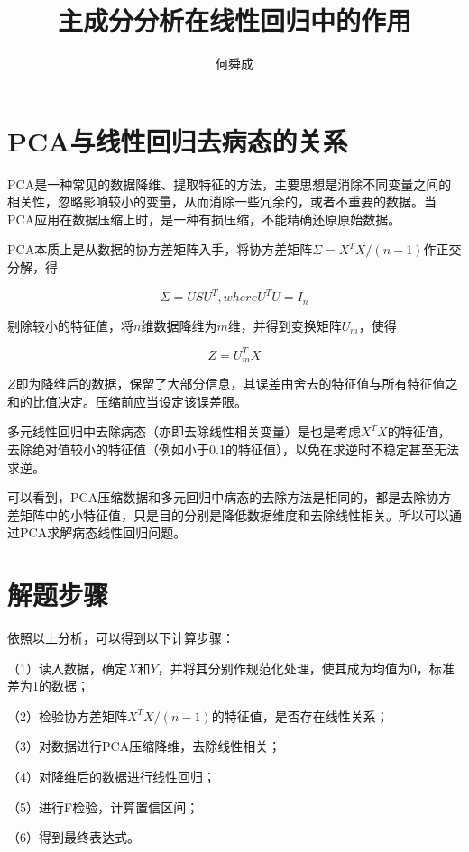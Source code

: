 \documentclass[UTF8]{ctexart}
\author{何舜成}
\title{主成分分析在线性回归中的作用}
\begin{document}
\maketitle
\section{PCA与线性回归去病态的关系}
PCA是一种常见的数据降维、提取特征的方法，主要思想是消除不同变量之间的相关性，忽略影响较小的变量，从而消除一些冗余的，或者不重要的数据。当PCA应用在数据压缩上时，是一种有损压缩，不能精确还原原始数据。\par
PCA本质上是从数据的协方差矩阵入手，将协方差矩阵$\Sigma=X^{T}X/(n-1)$作正交分解，得\par
\begin{equation}
\Sigma=USU^{T}, where  U^{T}U=I_{n}
\end{equation}
\par
剔除较小的特征值，将$n$维数据降维为$m$维，并得到变换矩阵$U_{m}$，使得\par
\begin{equation}
Z=U^{T}_{m}X
\end{equation}
\par
$Z$即为降维后的数据，保留了大部分信息，其误差由舍去的特征值与所有特征值之和的比值决定。压缩前应当设定该误差限。\par
多元线性回归中去除病态（亦即去除线性相关变量）是也是考虑$X^{T}X$的特征值，去除绝对值较小的特征值（例如小于0.1的特征值），以免在求逆时不稳定甚至无法求逆。\par
可以看到，PCA压缩数据和多元回归中病态的去除方法是相同的，都是去除协方差矩阵中的小特征值，只是目的分别是降低数据维度和去除线性相关。所以可以通过PCA求解病态线性回归问题。
\section{解题步骤}
依照以上分析，可以得到以下计算步骤：\par
（1）读入数据，确定$X$和$Y$，并将其分别作规范化处理，使其成为均值为0，标准差为1的数据；\par
（2）检验协方差矩阵$X^{T}X/(n-1)$的特征值，是否存在线性关系；\par
（3）对数据进行PCA压缩降维，去除线性相关；\par
（4）对降维后的数据进行线性回归；\par
（5）进行F检验，计算置信区间；\par
（6）得到最终表达式。
\end{document}
